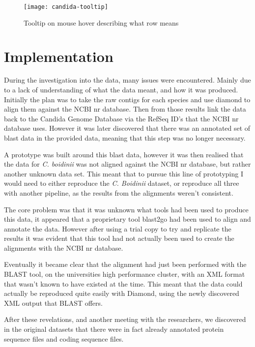 \begin{figure}[H]
\begin{center}
\texttt{[image: candida-tooltip]}
\caption{Tooltip on mouse hover describing what row means}
\end{center}
\end{figure}

\section{Implementation}
During the investigation into the data, many issues were encountered. Mainly due to a lack of understanding of what the data meant, and how it was produced. Initially the plan was to take the raw contigs for each species and use diamond to align them against the NCBI nr database. Then from those results link the data back to the Candida Genome Database via the RefSeq ID's that the NCBI nr database uses. However it was later discovered that there was an annotated set of blast data in the provided data, meaning that this step was no longer necessary.

A prototype was built around this blast data, however it was then realised that the data for \textit{C. boidinii} was not aligned against the NCBI nr database, but rather another unknown data set. This meant that to pursue this line of prototyping I would need to either reproduce the \textit{C. Boidinii} dataset, or reproduce all three with another pipeline, as the results from the alignments weren't consistent. 

The core problem was that it was unknown what tools had been used to produce this data, it appeared that a proprietary tool blast2go\cite{blast2go} had been used to align and annotate the data. However after using a trial copy to try and replicate the results it was evident that this tool had not actually been used to create the alignments with the NCBI nr database. 

Eventually it became clear that the alignment had just been performed with the BLAST tool, on the universities high performance cluster, with an XML format that wasn't known to have existed at the time. This meant that the data could actually be reproduced quite easily with Diamond, using the newly discovered XML output that BLAST offers.

After these revelations, and another meeting with the researchers, we discovered in the original datasets that there were in fact already annotated protein sequence files and coding sequence files.

